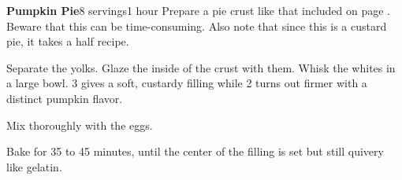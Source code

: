 \documentclass[../Cookbook.tex]{subfiles}
\begin{document}
\begin{recipe}[PumpkinPie]{\textbf{Pumpkin Pie}}{8 servings}{1 hour}
Prepare a pie crust like that included on page \pageref{PieCrust}. Beware that this can be time-consuming. Also note that since this is a custard pie, it takes a half recipe.
	
Separate the yolks. Glaze the inside of the crust with them.
Whisk the whites in a large bowl. 3 gives a soft, custardy filling while 2 turns out firmer with a distinct pumpkin flavor.

Mix thoroughly with the eggs.

Bake for 35 to 45 minutes, until the center of the filling is set but still quivery like gelatin.

	
\end{recipe}
\end{document}
